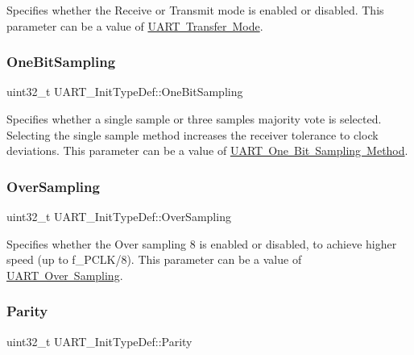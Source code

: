 Specifies whether the Receive or Transmit mode is enabled or disabled. This parameter can be a value of \mbox{\hyperlink{group___u_a_r_t___mode}{U\+A\+RT Transfer Mode}}. \mbox{\label{struct_u_a_r_t___init_type_def_a1662b82dc43d9137c3a4485794c94388}} 
\subsubsection{\texorpdfstring{OneBitSampling}{OneBitSampling}}
{\footnotesize\ttfamily uint32\+\_\+t U\+A\+R\+T\+\_\+\+Init\+Type\+Def\+::\+One\+Bit\+Sampling}

Specifies whether a single sample or three samples\textquotesingle{} majority vote is selected. Selecting the single sample method increases the receiver tolerance to clock deviations. This parameter can be a value of \mbox{\hyperlink{group___u_a_r_t___one_bit___sampling}{U\+A\+RT One Bit Sampling Method}}. \mbox{\label{struct_u_a_r_t___init_type_def_a77c2c86a2186e09cbf022e27c0c82324}} 
\subsubsection{\texorpdfstring{OverSampling}{OverSampling}}
{\footnotesize\ttfamily uint32\+\_\+t U\+A\+R\+T\+\_\+\+Init\+Type\+Def\+::\+Over\+Sampling}

Specifies whether the Over sampling 8 is enabled or disabled, to achieve higher speed (up to f\+\_\+\+P\+C\+L\+K/8). This parameter can be a value of \mbox{\hyperlink{group___u_a_r_t___over___sampling}{U\+A\+RT Over Sampling}}. \mbox{\label{struct_u_a_r_t___init_type_def_adc92243425cb18cb8b5f03692841db48}} 
\subsubsection{\texorpdfstring{Parity}{Parity}}
{\footnotesize\ttfamily uint32\+\_\+t U\+A\+R\+T\+\_\+\+Init\+Type\+Def\+::\+Parity}

